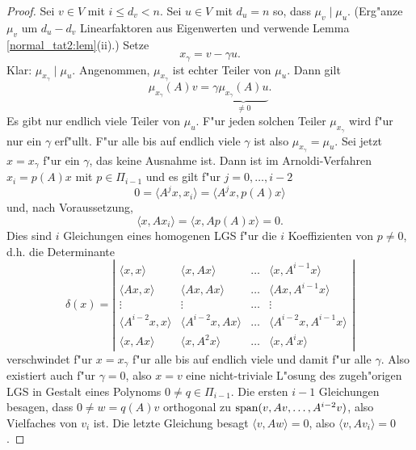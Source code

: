 \begin{proof}
Sei $v \in V$ mit $i \leq  d_v < n$. Sei $u \in V$ mit $d_u = n$ so, dass $\mu_v \mid \mu_u$. 
(Erg"anze $\mu_v$ um $d_u-d_v$ Linearfaktoren aus Eigenwerten und verwende Lemma \ref{normal_tat2:lem}(ii).)  Setze
\[
x_\gamma = v - \gamma u.
\]
Klar: $\mu_{x_\gamma} \mid \mu_u$. Angenommen, $\mu_{x_\gamma}$ ist echter Teiler
von $\mu_u$. Dann gilt
\begin{equation} \label{mugamma:eq}
  \mu_{x_\gamma}(A)v = \gamma \underbrace{\mu_{x_\gamma}(A)u}_{\neq 0}.
\end{equation}
Es gibt nur endlich viele Teiler von $\mu_u$. F"ur jeden solchen Teiler $\mu_{x_\gamma}$
wird  f"ur nur ein $\gamma$ erf"ullt. F"ur alle bis auf endlich viele
$\gamma$ ist also $\mu_{x_\gamma} = \mu_u$. Sei jetzt $x = x_\gamma$ f"ur ein $\gamma$,
das keine Ausnahme ist. Dann ist im Arnoldi-Verfahren $x_i = p(A)x$ mit $p \in \Pi_{i-1}$
und es gilt f"ur $j=0,\ldots,i-2$
\[
  0 = \langle A^j x, x_i \rangle = \langle A^j x, p(A)x \rangle
\]
und, nach Voraussetzung,
\[
\langle x , Ax_i \rangle  = \langle x, Ap(A)x \rangle = 0.
\]
Dies sind $i$ Gleichungen eines homogenen LGS f"ur die $i$ Koeffizienten 
von $p \neq 0$, d.h. die Determinante
\[
\delta(x) = 
\left| 
\begin{array}{cccc}
   \langle x, x \rangle & \langle x, Ax \rangle & \ldots & \langle x, A^{i-1} x \rangle \\
  \langle Ax, x \rangle & \langle Ax, Ax \rangle & \ldots & \langle Ax, A^{i-1} x \rangle \\
    \vdots              &    \vdots              &    \ldots & \vdots \\
 \langle A^{i-2}x, x \rangle & \langle A^{i-2}x, Ax \rangle & \ldots & \langle A^{i-2}x, A^{i-1} x \rangle \\
 \langle x, Ax \rangle & \langle x, A^2x \rangle & \ldots & \langle x, A^{i} x \rangle 
\end{array}
              \right|
\]
verschwindet f"ur $x = x_\gamma$ f"ur alle bis auf endlich viele und damit f"ur alle
$\gamma$. Also existiert auch f"ur $\gamma = 0$, also $x=v$ eine nicht-triviale L"osung
des zugeh"origen LGS in Gestalt eines Polynoms $0 \neq q \in \Pi_{i-1}$. Die ersten
$i-1$ Gleichungen besagen, dass $0 \neq w = q(A)v$ orthogonal zu
$\operatorname{span}(v,Av,\ldots,A^{i-2} v)$,
also Vielfaches von $v_{i}$ ist. Die letzte Gleichung besagt $\langle v, Aw \rangle = 0$,
also $\langle v, Av_i \rangle = 0$. 
\end{proof}


